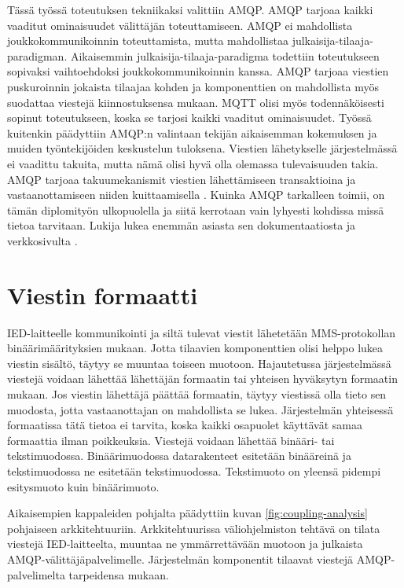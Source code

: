 Tässä työssä toteutuksen tekniikaksi valittiin AMQP. AMQP tarjoaa kaikki vaaditut ominaisuudet välittäjän toteuttamiseen. AMQP ei mahdollista joukkokommunikoinnin toteuttamista, mutta mahdollistaa julkaisija-tilaaja-paradigman. Aikaisemmin julkaisija-ti\-laa\-ja-paradigma todettiin toteutukseen sopivaksi vaihtoehdoksi joukkokommunikoinnin kanssa. AMQP tarjoaa viestien puskuroinnin jokaista tilaajaa kohden ja komponenttien on mahdollista myös suodattaa viestejä kiinnostuksensa mukaan. MQTT olisi myös todennäköisesti sopinut toteutukseen, koska se tarjosi kaikki vaaditut ominaisuudet. Työssä kuitenkin päädyttiin AMQP:n valintaan tekijän aikaisemman kokemuksen ja muiden työntekijöiden keskustelun tuloksena. Viestien lähetykselle järjestelmässä ei vaadittu takuita, mutta nämä olisi hyvä olla olemassa tulevaisuuden takia. AMQP tarjoaa takuumekanismit viestien lähettämiseen transaktioina ja vastaanottamiseen niiden kuittaamisella \cite[s.~14,21]{AMQP-specification}. Kuinka AMQP tarkalleen toimii, on tämän diplomityön ulkopuolella ja siitä kerrotaan vain lyhyesti kohdissa missä tietoa tarvitaan. Lukija lukea enemmän asiasta sen dokumentaatiosta \cite{AMQP-specification} ja verkkosivulta \cite{amqp-homepage}.


\section{Viestin formaatti}
IED-laitteelle kommunikointi ja siltä tulevat viestit lähetetään MMS-protokollan binäärimäärityksien mukaan. Jotta tilaavien komponenttien olisi helppo lukea viestin sisältö, täytyy se muuntaa toiseen muotoon. Hajautetussa järjestelmässä viestejä voidaan lähettää lähettäjän formaatin tai yhteisen hyväksytyn formaatin mukaan. Jos viestin lähettäjä päättää formaatin, täytyy viestissä olla tieto sen muodosta, jotta vastaanottajan on mahdollista se lukea. Järjestelmän yhteisessä formaatissa tätä tietoa ei tarvita, koska kaikki osapuolet käyttävät samaa formaattia ilman poikkeuksia. Viestejä voidaan lähettää binääri- tai tekstimuodossa. Binäärimuodossa datarakenteet esitetään binääreinä ja tekstimuodossa ne esitetään tekstimuodossa. Tekstimuoto on yleensä pidempi esitysmuoto kuin binäärimuoto.

Aikaisempien kappaleiden pohjalta päädyttiin kuvan \ref{fig:coupling-analysis} pohjaiseen arkkitehtuuriin. Arkkitehtuurissa väliohjelmiston tehtävä on tilata viestejä IED-laitteelta, muuntaa ne ymmärrettävään muotoon ja julkaista AMQP-välittäjäpalvelimelle. Järjestelmän komponentit tilaavat viestejä AMQP-palvelimelta tarpeidensa mukaan.

